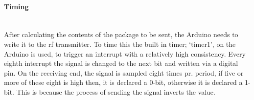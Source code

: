 \paragraph{Timing} \hfill \\
After calculating the contents of the package to be sent, the Arduino needs to write it to the \gls{rf} transmitter. 
To time this the built in timer; \enquote*{timer1}, on the Arduino is used, to trigger an interrupt with a relatively high consistency.
Every eighth interrupt the signal is changed to the next bit and written via a digital pin. 
On the receiving end, the signal is sampled eight times pr. period, if five or more of these eight is high then, it is declared a 0-bit, otherwise it is declared a 1-bit. %
This is because the process of sending the signal inverts the value.
